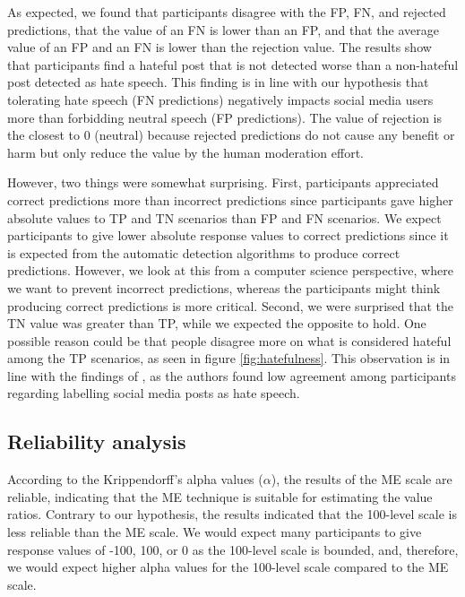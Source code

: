 %
As expected, we found that participants disagree with the FP, FN, and rejected predictions, that the value of an FN is lower than an FP, and that the average value of an FP and an FN is lower than the rejection value.
%
The results show that participants find a hateful post that is not detected worse than a non-hateful post detected as hate speech.
%
This finding is in line with our hypothesis that tolerating hate speech (FN predictions) negatively impacts social media users more than forbidding neutral speech (FP predictions).
%
The value of rejection is the closest to 0 (neutral) because rejected predictions do not cause any benefit or harm but only reduce the value by the human moderation effort.
%

%
However, two things were somewhat surprising.
%
First, participants appreciated correct predictions more than incorrect predictions since participants gave higher absolute values to TP and TN scenarios than FP and FN scenarios.
%
We expect participants to give lower absolute response values to correct predictions since it is expected from the automatic detection algorithms to produce correct predictions.
%
However, we look at this from a computer science perspective, where we want to prevent incorrect predictions, whereas the participants might think producing correct predictions is more critical.
%
Second, we were surprised that the TN value was greater than TP, while we expected the opposite to hold.
%
One possible reason could be that people disagree more on what is considered hateful among the TP scenarios, as seen in figure \ref{fig:hatefulness}.
%
This observation is in line with the findings of \citet{ross2017measuring}, as the authors found low agreement among participants regarding labelling social media posts as hate speech.
%

\subsection{Reliability analysis}
\label{sec:discussion-reliability}
%
According to the Krippendorff's alpha values ($\alpha$), the results of the ME scale are reliable, indicating that the ME technique is suitable for estimating the value ratios.
%
Contrary to our hypothesis, the results indicated that the 100-level scale is less reliable than the ME scale.
%
We would expect many participants to give response values of -100, 100, or 0 as the 100-level scale is bounded, and, therefore, we would expect higher alpha values for the 100-level scale compared to the ME scale.
%

